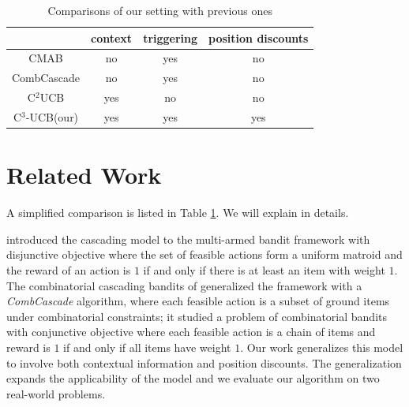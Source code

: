 \documentclass{article}
\begin{document}
\begin{table}
	\renewcommand{\arraystretch}{1.1}
	\centering
	\begin{tabular}{|c|c|c|c|}
		\hline
		 &context &triggering &position discounts \\
		\hline
		CMAB &no &yes &no \\
		\hline
		CombCascade	&no &yes &no  \\
		\hline
		C$^2$UCB &yes &no &no  \\
		\hline
		C$^3$-UCB(our) &yes &yes &yes \\
		\hline
	\end{tabular}
	\caption{Comparisons of our setting with previous ones }
	\label{table:outline}
\end{table} 


\section{Related Work}

A simplified comparison is listed in Table \ref{table:outline}. We will explain in details.

\cite{kveton2015cascading} introduced the cascading model to the multi-armed bandit framework with disjunctive objective where the set of feasible actions form a uniform matroid and the reward of an action is $1$ if and only if there is at least an item with weight $1$. The combinatorial cascading bandits of \cite{kveton2015combinatorial} generalized the framework with a {\it CombCascade} algorithm, where each feasible action is a subset of ground items under combinatorial constraints; it studied a problem of combinatorial bandits with conjunctive objective where each feasible action is a chain of items and reward is $1$ if and only if all items have weight $1$. Our work generalizes this model to involve both contextual information and position discounts. The generalization expands the applicability of the model and we evaluate our algorithm on two real-world problems. 
\end{document}
